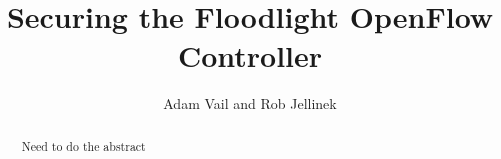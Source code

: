 \documentclass[11pt,pdftex,twocolumn]{article}
\title{Securing the Floodlight OpenFlow Controller}
\author{Adam Vail and Rob Jellinek}
\begin{document}
\maketitle

\begin{abstract}
Need to do the abstract
\end{abstract}



%
%
%

% 

{\footnotesize 
}
\end{document}
